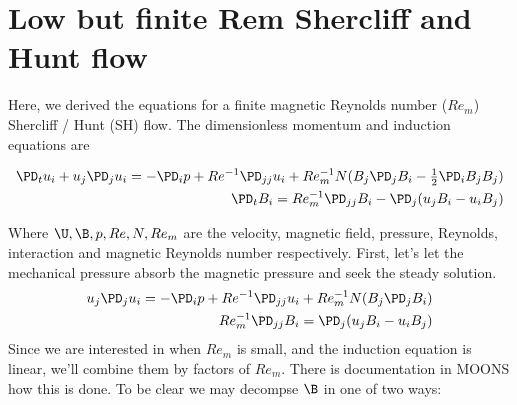\documentclass[11pt]{article}
\begin{document}
\doublespacing
\MOONSTITLE
\maketitle

\section{Low but finite Rem Shercliff and Hunt flow}
Here, we derived the equations for a finite magnetic Reynolds number ($Re_m$) Shercliff / Hunt (SH) flow. The dimensionless momentum and induction equations are

\begin{equation}\begin{aligned}
\PD_t u_i+u_j\PD_j u_i =-\PD_i p+ Re^{-1} \PD_{jj} u_i + Re_m^{-1} N (B_j \PD_j B_i - \tfrac{1}{2} \PD_i B_j B_j) \\
\PD_t B_i = Re_m^{-1} \PD_{jj} B_i - \PD_j (u_j B_i - u_i B_j)
\end{aligned} \end{equation}

Where $\U,\B,p,Re,N,Re_m$ are the velocity, magnetic field, pressure, Reynolds, interaction and magnetic Reynolds number respectively. First, let's let the mechanical pressure absorb the magnetic pressure and seek the steady solution.
\begin{equation}\begin{aligned}
u_j\PD_j u_i =-\PD_i p+ Re^{-1} \PD_{jj} u_i + Re_m^{-1} N (B_j \PD_j B_i) \\
Re_m^{-1} \PD_{jj} B_i = \PD_j (u_j B_i - u_i B_j)
\end{aligned} \end{equation}
Since we are interested in when $Re_m$ is small, and the induction equation is linear, we'll combine them by factors of $Re_m$. There is documentation in MOONS how this is done. To be clear we may decompse $\B$ in one of two ways:
\end{document}

